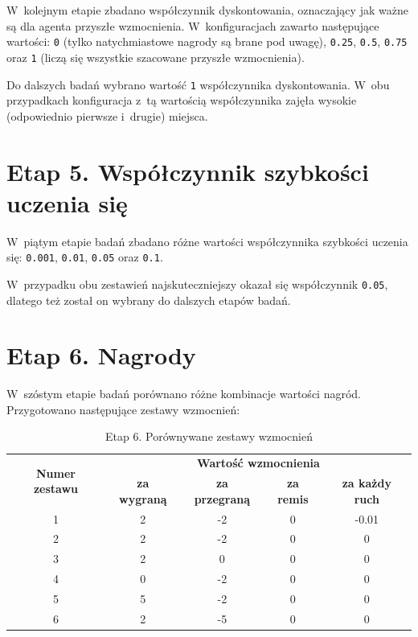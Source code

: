 \documentclass[a4paper, 12pt, oneside]{report}
\begin{document}
 W~kolejnym etapie zbadano współczynnik dyskontowania, oznaczający jak ważne są dla agenta przyszłe wzmocnienia. W~konfiguracjach zawarto następujące wartości: \texttt{0} (tylko natychmiastowe nagrody są brane pod uwagę), \texttt{0.25}, \texttt{0.5}, \texttt{0.75} oraz \texttt{1} (liczą się wszystkie szacowane przyszłe wzmocnienia).

\needspace{10em}



\needspace{5em}



Do dalszych badań wybrano wartość \texttt{1} współczynnika dyskontowania. W~obu przypadkach konfiguracja z~tą wartością współczynnika zajęła wysokie (odpowiednio pierwsze i~drugie) miejsca.

\section{Etap 5. Współczynnik szybkości uczenia się}

 W~piątym etapie badań zbadano różne wartości współczynnika szybkości uczenia się: \texttt{0.001}, \texttt{0.01}, \texttt{0.05} oraz \texttt{0.1}.

\needspace{5em}



\needspace{5em}



 W~przypadku obu zestawień najskuteczniejszy okazał się współczynnik \texttt{0.05}, dlatego też został on wybrany do dalszych etapów badań.

\section{Etap 6. Nagrody}

 W~szóstym etapie badań porównano różne kombinacje wartości nagród. Przygotowano następujące zestawy wzmocnień:

\begin{longtable}[c]{|c|c|c|c|c|}
\caption{\label{tab:results/stage_two_all_play_all}Etap 6. Porównywane zestawy wzmocnień} \\
\hline
\multirow{2}{*}{\textbf{Numer zestawu}} & \multicolumn{4}{|c|}{\textbf{Wartość wzmocnienia}} \\
\cline{2-5}
&\textbf{za wygraną} & \textbf{za przegraną} & \textbf{za remis} & \textbf{za każdy ruch} \\
\hline
1 & 2 & -2 & 0 & -0.01 \\
\hline
2 & 2 & -2 & 0 & 0 \\
\hline
3 & 2 & 0 & 0 & 0 \\
\hline
4 & 0 & -2 & 0 & 0 \\
\hline
5 & 5 & -2 & 0 & 0 \\
\hline
6 & 2 & -5 & 0 & 0 \\
\hline
\end{longtable}
\end{document}
